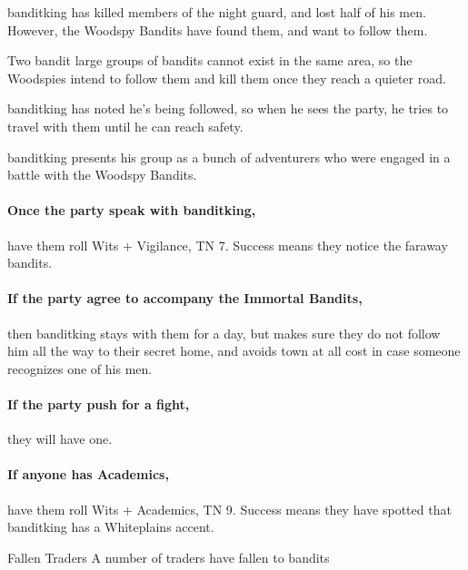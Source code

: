 \begin{multicols}{2}
\begin{exampletext}

	\Gls{banditking} has killed members of the night guard, and lost half of his men.
	However, the Woodspy Bandits have found them, and want to follow them.

	Two bandit large groups of bandits cannot exist in the same area, so the Woodspies intend to follow them and kill them once they reach a quieter road.

	\Gls{banditking} has noted he's being followed, so when he sees the party, he tries to travel with them until he can reach safety.

\end{exampletext}

\noindent
\Gls{banditking} presents his group as a bunch of adventurers who were engaged in a battle with the Woodspy Bandits.

\paragraph{Once the party speak with \gls{banditking},}
have them roll Wits + Vigilance, TN 7.
Success means they notice the faraway bandits.

\paragraph{If the party agree to accompany the Immortal Bandits,}
then \gls{banditking} stays with them for a day, but makes sure they do not follow him all the way to their secret home, and avoids town at all cost in case someone recognizes one of his men.

\paragraph{If the party push for a fight,}
they will have one.

\paragraph{If anyone has Academics,}
have them roll Wits + Academics, TN 9.
Success means they have spotted that \gls{banditking} has a Whiteplains accent.


\banditking


{Fallen Traders}%
{A number of traders have fallen to bandits}%


\end{multicols}
